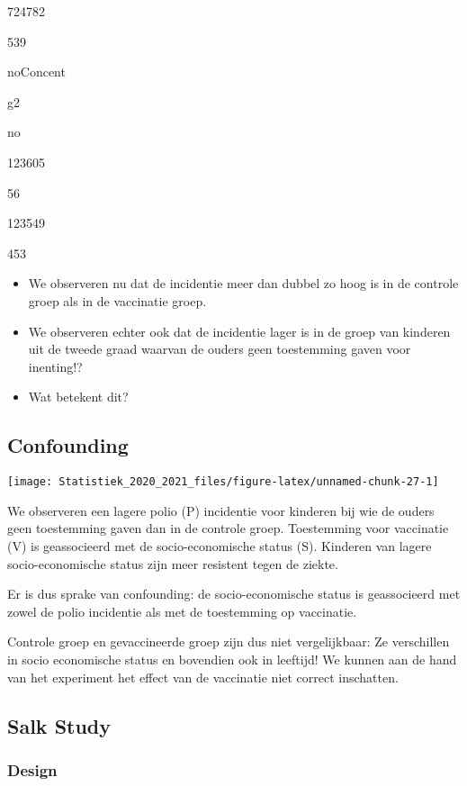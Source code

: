 \documentclass[
  12pt,dutch,coursenotes]{book}
\theoremstyle{definition}
\theoremstyle{definition}
\theoremstyle{definition}
\theoremstyle{remark}
\begin{document}
724782

539

noConcent

g2

no

123605

56

123549

453

\begin{itemize}
\item
  We observeren nu dat de incidentie meer dan dubbel zo hoog is in de controle groep als in de vaccinatie groep.
\item
  We observeren echter ook dat de incidentie lager is in de groep van kinderen uit de tweede graad waarvan de ouders geen toestemming gaven voor inenting!?
\item
  Wat betekent dit?
\end{itemize}

\hypertarget{confounding}{%
\subsection{Confounding}\label{confounding}}

\begin{center}\texttt{[image: Statistiek\_2020\_2021\_files/figure-latex/unnamed-chunk-27-1]} \end{center}

We observeren een lagere polio (P) incidentie voor kinderen bij wie de ouders geen toestemming gaven dan in de controle groep.
Toestemming voor vaccinatie (V) is geassocieerd met de socio-economische status (S).
Kinderen van lagere socio-economische status zijn meer resistent tegen de ziekte.

Er is dus sprake van confounding: de socio-economische status is geassocieerd met zowel de polio incidentie als met de toestemming op vaccinatie.

Controle groep en gevaccineerde groep zijn dus niet vergelijkbaar:
Ze verschillen in socio economische status en bovendien ook in leeftijd!
We kunnen aan de hand van het experiment het effect van de vaccinatie niet correct inschatten.

\hypertarget{salk-study}{%
\subsection{Salk Study}\label{salk-study}}

\hypertarget{design-1}{%
\subsubsection{Design}\label{design-1}}
\end{document}
